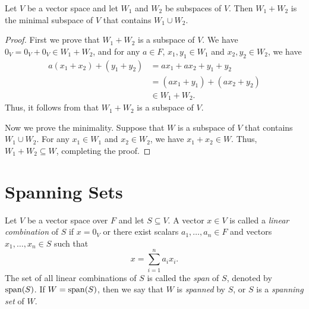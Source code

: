 \begin{theorem}
  \label{thm:subspace-sum}
  Let $V$ be a vector space and let $W_1$ and $W_2$ be subspaces of $V$.
  Then $W_1 + W_2$ is the minimal subspace of $V$ that contains $W_1 \cup W_2$.
\end{theorem}
\begin{proof}
  First we prove that $W_1 + W_2$ is a subspace of $V$.
  We have $0_V = 0_V + 0_V \in W_1 + W_2$, and for any $a \in F$,
  $x_1, y_1 \in W_1$ and $x_2, y_2 \in W_2$, we have
  \begin{align*}
    a(x_1 + x_2) + (y_1 + y_2)
    &= ax_1 + ax_2 + y_1 + y_2 \\
    &= (ax_1 + y_1) + (ax_2 + y_2) \\
    &\in W_1 + W_2.
  \end{align*}
  Thus, it follows from  that $W_1 + W_2$ is a subspace of
  $V$.

  Now we prove the minimality.
  Suppose that $W$ is a subspace of $V$ that contains $W_1 \cup W_2$.
  For any $x_1 \in W_1$ and $x_2 \in W_2$, we have $x_1 + x_2 \in W$.
  Thus, $W_1 + W_2 \subseteq W$, completing the proof.
\end{proof}

\section{Spanning Sets}
\begin{definition}
  \label{def:linear-combination}
  Let $V$ be a vector space over $F$ and let $S \subseteq V$.
  A vector $x \in V$ is called a \emph{linear combination} of $S$ if $x = 0_V$
  or there exist scalars $a_1, \dots, a_n \in F$ and vectors
  $x_1, \dots, x_n \in S$ such that
  \begin{equation*}
    x = \sum_{i=1}^n a_ix_i.
  \end{equation*}
  The set of all linear combinations of $S$ is called the \emph{span} of $S$,
  denoted by $\operatorname{span}(S)$.
  If $W = \operatorname{span}(S)$, then we say that $W$ is \emph{spanned} by $S$, or $S$ is a
  \emph{spanning set} of $W$.
\end{definition}

